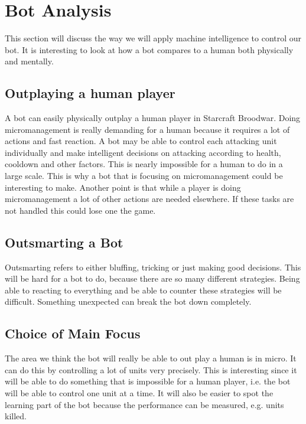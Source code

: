 \section{Bot Analysis}
	This section will discuss the way we will apply machine intelligence to control our bot. It is interesting to look at how a bot compares to a human both physically and mentally. 
	
	\subsection*{Outplaying a human player}
		A bot can easily physically outplay a human player in Starcraft Broodwar. 
		Doing micromanagement is really demanding for a human because it requires a lot of actions and fast reaction. A bot may be able to control each 
		attacking unit individually and make intelligent decisions on attacking according to health, cooldown and other factors. This is nearly impossible for a human to do in a large scale. This is why a bot that is focusing on micromanagement could be interesting to make. Another point 
		is that while a player is doing micromanagement a lot of other actions are needed elsewhere. If these tasks are not handled this could lose one the game.
		
	\subsection*{Outsmarting a Bot}
		Outsmarting refers to either bluffing, tricking or just making good decisions. This will be hard for a bot to do, because there are so many 
		different strategies. Being able to reacting to everything and be able to counter these strategies will be difficult. Something unexpected 
		can break the bot down completely.

\subsection{Choice of Main Focus}
	The area we think the bot will really be able to out play a human is in micro. It can do this by controlling a lot of units very precisely. This is interesting since it will be able to do something that is impossible for a human player, i.e. the bot will be able to control one unit at a time. It will also be easier to spot the learning part of the bot because the performance can be measured, e.g. units killed.